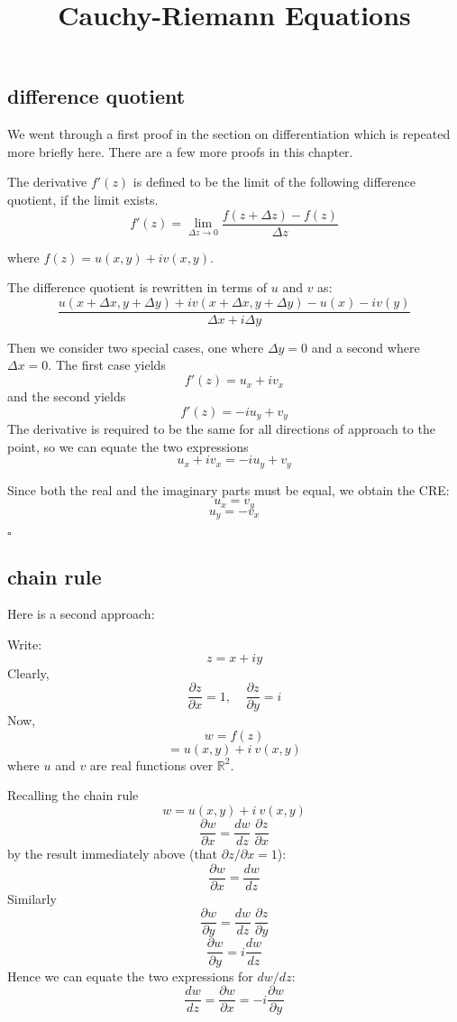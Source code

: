 \documentclass[11pt, oneside]{article}
\title{Cauchy-Riemann Equations}
\date{}
\begin{document}
\maketitle
\Large


\subsection*{difference quotient}

We went through a first proof in the section on differentiation which is repeated more briefly here.  There are a few more proofs in this chapter.

The derivative $f'(z)$ is defined to be the limit of the following difference quotient, if the limit exists.
\[ f'(z) = \lim_{\Delta z \rightarrow 0} \frac{f(z + \Delta z) - f(z)}{\Delta z} \]

where $f(z) = u(x,y) + i v(x,y)$.

The difference quotient is rewritten in terms of $u$ and $v$ as:
\[ \frac{u(x + \Delta x, y + \Delta y) + i v(x + \Delta x, y + \Delta y) - u(x) - i v(y)}{\Delta x + i \Delta y} \]

Then we consider two special cases, one where $\Delta y = 0$ and a second where $\Delta x = 0$.  The first case yields
\[ f'(z) = u_x + i v_x \]
and the second yields
\[ f'(z) = -i u_y + v_y \]
The derivative is required to be the same for all directions of approach to the point, so we can equate the two expressions
\[ u_x + i v_x = -i u_y + v_y \]

Since both the real and the imaginary parts must be equal, we obtain the CRE:
\[ u_x = v_y \]
\[ u_y = - v_x \]

$\square$

\subsection*{chain rule}
Here is a second approach:

Write:
\[ z = x + iy \]
Clearly,
\[ \frac{\partial z}{\partial x} = 1,  \ \ \ \ \  \frac{\partial z}{\partial y} = i \]
Now,
\[ w = f(z) \]
\[ = u(x,y) + i \ v(x,y) \]
where $u$ and $v$ are real functions over $\mathbb{R}^2$.

Recalling the chain rule
\[ w = u(x,y) + i \ v(x,y) \]
\[ \frac{\partial w}{\partial x} = \frac{dw}{dz} \ \frac{\partial z}{\partial x} \]
by the result immediately above (that $\partial z/\partial x = 1$):
\[ \frac{\partial w}{\partial x} =  \frac{dw}{dz} \]
Similarly
\[ \frac{\partial w}{\partial y} = \frac{dw}{dz} \ \frac{\partial z}{\partial y} \]
\[ \frac{\partial w}{\partial y} =  i \frac{dw}{dz} \]
Hence we can equate the two expressions for $dw/dz$:
\[ \frac{dw}{dz} = \frac{\partial w}{\partial x} = -i \frac{\partial w}{\partial y} \]
\end{document}
